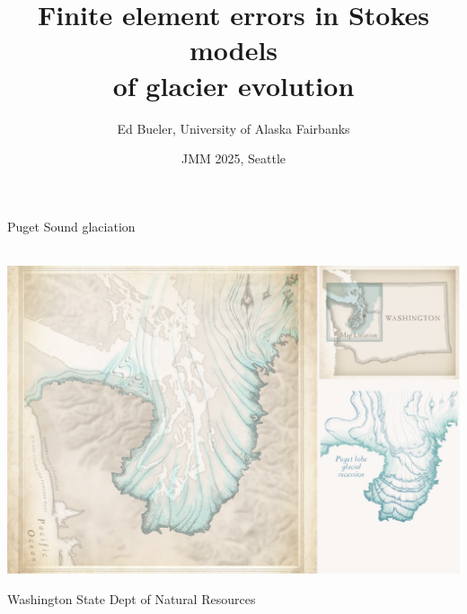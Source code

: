 \documentclass[10pt,dvipsnames]{beamer}
\title{Finite element errors in Stokes models \\ of glacier evolution}
\date{JMM 2025, Seattle}
\author{Ed Bueler, University of Alaska Fairbanks}
\begin{document}
\graphicspath{{figs/}{../NWG24/figs/}{../../paper/figs/}}

\maketitle


\begin{frame}{Puget Sound glaciation}

\mbox{\hspace{-7mm} \,\includegraphics[width=1.1\textwidth]{puget}}

\vspace{-4mm}

\hfill {\tiny Washington State Dept of Natural Resources}
\end{frame}
\end{document}
